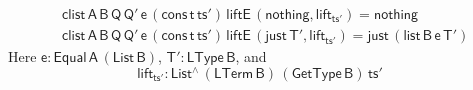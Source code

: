 \documentclass[sigplan,screen]{acmart}
\begin{document}
\begin{align*}
  &\mathsf{clist\, A\, B\, Q\, Q'\, e\, (cons\, t\, ts') \, liftE\,
    (nothing , lift_{ts'}) = nothing} \\ 
  &\mathsf{clist\, A\, B\, Q\, Q'\, e\, (cons\, t\, ts') \, liftE\,
    (just\, T' , lift_{ts'}) = just \, (list\, B\, e\, T')} 
\end{align*}
Here $\mathsf{e : Equal\, A\, (List\,B)}$, $\mathsf{T' : LType\, B}$,
and
\[\mathsf{lift_{ts'} : List^{\wedge}\, (LTerm\, B)\, (GetType\,
  B)\, ts'}\]
\end{document}
